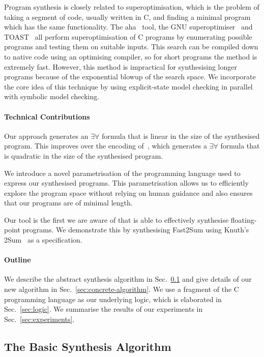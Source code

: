 Program synthesis is closely related to
superoptimisation, which is the problem of taking a
segment of code, usually written in C, and finding a minimal program which
has the same functionality.  The {\sc aha}~\cite{aha-paper} tool, the GNU
superoptimiser~\cite{gnu-superoptimiser} and TOAST~\cite{toast} all perform superoptimisation of C
programs by enumerating possible programs and testing them on suitable
inputs.  This search can be compiled down to native code using an optimising
compiler, so for short programs the method is extremely fast.  However, this
method is impractical for synthesising longer programs because of the
exponential blowup of the search space.  We incorporate the core idea of
this technique by using explicit-state model checking in parallel with
symbolic model checking.

\paragraph{Technical Contributions}
Our approach generates an $\exists \forall$ formula that is linear
in the size of the synthesised program.  This improves over the
encoding of~\cite{brahma}, which generates a $\exists \forall$ formula
that is quadratic in the size of the synthesised program.

We introduce a novel parametrisation of the programming language
used to express our synthesised programs.
This parametrisation allows us to efficiently explore the program space
without relying on human guidance and also ensures that our programs
are of minimal length.

Our tool is the first we are aware of that is able to effectively
synthesise floating-point programs.  We demonstrate this by
synthesising {\sc Fast2Sum} using Knuth's {\sc 2Sum}~\cite{taocp2} as
a specification.

\paragraph{Outline} We describe the abstract synthesis algorithm in
Sec.~\ref{sec:abstract-algorithm} and give details of our new algorithm in
Sec.~\ref{sec:concrete-algorithm}.  We use a fragment of the C programming language
as our underlying logic, which is elaborated in Sec.~\ref{sec:logic}. We
summarise the results of our experiments in Sec.~\ref{sec:experiments}.
\fi

\iffalse
\subsection{The Basic Synthesis Algorithm}
\label{sec:abstract-algorithm}

